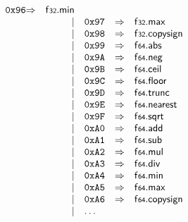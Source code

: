 $$\begin{array}{@{}l@{}rrlll@{}l@{}}
\mathtt{0x96} &\Rightarrow& \mathsf{f{\scriptstyle32}} . \mathsf{min} \\ &&|&
\mathtt{0x97} &\Rightarrow& \mathsf{f{\scriptstyle32}} . \mathsf{max} \\ &&|&
\mathtt{0x98} &\Rightarrow& \mathsf{f{\scriptstyle32}} . \mathsf{copysign} \\ &&|&
\mathtt{0x99} &\Rightarrow& \mathsf{f{\scriptstyle64}} . \mathsf{abs} \\ &&|&
\mathtt{0x9A} &\Rightarrow& \mathsf{f{\scriptstyle64}} . \mathsf{neg} \\ &&|&
\mathtt{0x9B} &\Rightarrow& \mathsf{f{\scriptstyle64}} . \mathsf{ceil} \\ &&|&
\mathtt{0x9C} &\Rightarrow& \mathsf{f{\scriptstyle64}} . \mathsf{floor} \\ &&|&
\mathtt{0x9D} &\Rightarrow& \mathsf{f{\scriptstyle64}} . \mathsf{trunc} \\ &&|&
\mathtt{0x9E} &\Rightarrow& \mathsf{f{\scriptstyle64}} . \mathsf{nearest} \\ &&|&
\mathtt{0x9F} &\Rightarrow& \mathsf{f{\scriptstyle64}} . \mathsf{sqrt} \\ &&|&
\mathtt{0xA0} &\Rightarrow& \mathsf{f{\scriptstyle64}} . \mathsf{add} \\ &&|&
\mathtt{0xA1} &\Rightarrow& \mathsf{f{\scriptstyle64}} . \mathsf{sub} \\ &&|&
\mathtt{0xA2} &\Rightarrow& \mathsf{f{\scriptstyle64}} . \mathsf{mul} \\ &&|&
\mathtt{0xA3} &\Rightarrow& \mathsf{f{\scriptstyle64}} . \mathsf{div} \\ &&|&
\mathtt{0xA4} &\Rightarrow& \mathsf{f{\scriptstyle64}} . \mathsf{min} \\ &&|&
\mathtt{0xA5} &\Rightarrow& \mathsf{f{\scriptstyle64}} . \mathsf{max} \\ &&|&
\mathtt{0xA6} &\Rightarrow& \mathsf{f{\scriptstyle64}} . \mathsf{copysign} \\ &&|&
\dots \\
\end{array}
$$

\vspace{1ex}

